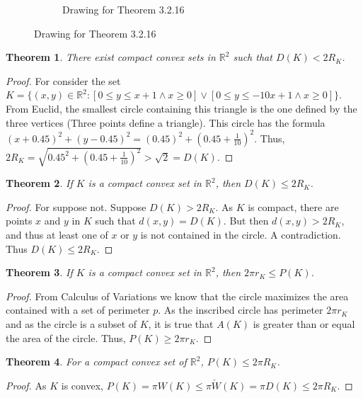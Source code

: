 \documentclass[oneside]{book}
\theoremstyle{mystyle}
\newtheorem{theorem}{Theorem}[section]
\begin{document}
\begin{figure}[H]
\begin{subfigure}[b]{0.49\textwidth}
    \caption{Drawing for Theorem 3.2.16}
  \end{subfigure}
\end{figure}


\begin{theorem}
There exist compact convex sets in $\mathbb{R}^2$ such that $D(K) < 2R_K$.
\end{theorem}
\begin{proof}
For consider the set $K=\{(x,y)\in \mathbb{R}^2: [0\leq y\leq x+1 \land x\geq 0]\lor [0\leq y\leq -10x+1\land x\geq 0]\}$. From Euclid, the smallest circle containing this triangle is the one defined by the three vertices (Three points define a triangle). This circle has the formula $(x+0.45)^2+(y-0.45)^2 = (0.45)^2 +(0.45+\frac{1}{10})^2$. Thus, $2R_K = \sqrt{0.45^2 +(0.45+\frac{1}{10})^2} > \sqrt{2} = D(K)$.
\end{proof}

\begin{theorem}
If $K$ is a compact convex set in $\mathbb{R}^2$, then $D(K) \leq 2R_K$.
\end{theorem}
\begin{proof}
For suppose not. Suppose $D(K) > 2R_K$. As $K$ is compact, there are points $x$ and $y$ in $K$ such that $d(x,y)=D(K)$. But then $d(x,y)>2R_K$, and thus at least one of $x$ or $y$ is not contained in the circle. A contradiction. Thus $D(K)\leq 2R_K$.
\end{proof}

\begin{theorem}
If $K$ is a compact convex set in $\mathbb{R}^2$, then $2\pi r_K \leq P(K)$.
\end{theorem}
\begin{proof}
From Calculus of Variations we know that the circle maximizes the area contained with a set of perimeter $p$. As the inscribed circle has perimeter $2\pi r_K$ and as the circle is a subset of $K$, it is true that $A(K)$ is greater than or equal the area of the circle. Thus, $P(K)\geq 2\pi r_K$.
\end{proof}

\begin{theorem}
For a compact convex set of $\mathbb{R}^2$, $P(K) \leq 2\pi R_K$.
\end{theorem}
\begin{proof}
As $K$ is convex, $P(K) = \pi W(K) \leq \pi \check{W}(K) = \pi D(K) \leq 2\pi R_K$.
\end{proof}
\end{document}
